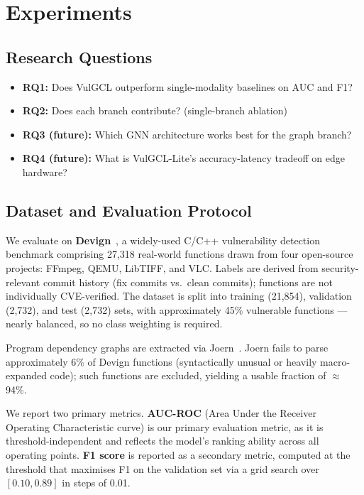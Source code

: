 \section{Experiments}
\label{sec:experiments}

\subsection{Research Questions}

\begin{itemize}
  \item \textbf{RQ1:} Does VulGCL outperform single-modality baselines on AUC and F1?
  \item \textbf{RQ2:} Does each branch contribute? (single-branch ablation)
  \item \textbf{RQ3 (future):} Which GNN architecture works best for the graph branch?
  \item \textbf{RQ4 (future):} What is VulGCL-Lite's accuracy-latency tradeoff on edge hardware?
\end{itemize}

\subsection{Dataset and Evaluation Protocol}

We evaluate on \textbf{Devign}~\cite{devign}, a widely-used C/C++ vulnerability detection
benchmark comprising 27,318 real-world functions drawn from four open-source projects:
FFmpeg, QEMU, LibTIFF, and VLC. Labels are derived from security-relevant commit history
(fix commits vs.\ clean commits); functions are not individually CVE-verified.
The dataset is split into training (21,854), validation (2,732), and test (2,732)
sets, with approximately 45\% vulnerable functions — nearly balanced, so no class
weighting is required.

Program dependency graphs are extracted via Joern~\cite{joern}. Joern fails to parse
approximately 6\% of Devign functions (syntactically unusual or heavily
macro-expanded code); such functions are excluded, yielding a usable fraction of
$\approx$94\%.

We report two primary metrics. \textbf{AUC-ROC} (Area Under the Receiver Operating
Characteristic curve) is our primary evaluation metric, as it is threshold-independent
and reflects the model's ranking ability across all operating points.
\textbf{F1 score} is reported as a secondary metric, computed at the threshold
that maximises F1 on the validation set via a grid search over $[0.10, 0.89]$ in
steps of 0.01.

